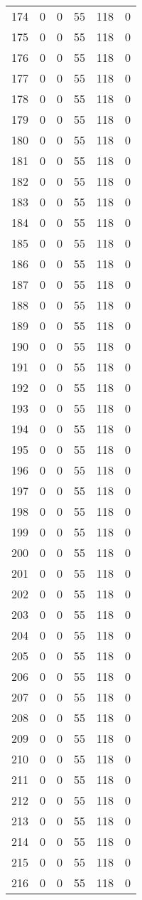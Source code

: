 \documentclass[a4paper]{ctexart}
\begin{document}
\begin{longtable}{p{1cm}|p{2cm}|p{2cm}|p{2cm}|P{2cm}|p{2cm}}
		174&0&0&55&118&0\\
		175&0&0&55&118&0\\
		176&0&0&55&118&0\\
		177&0&0&55&118&0\\
		178&0&0&55&118&0\\
		179&0&0&55&118&0\\
		180&0&0&55&118&0\\
		181&0&0&55&118&0\\
		182&0&0&55&118&0\\
		183&0&0&55&118&0\\
		184&0&0&55&118&0\\
		185&0&0&55&118&0\\
		186&0&0&55&118&0\\
		187&0&0&55&118&0\\
		188&0&0&55&118&0\\
		189&0&0&55&118&0\\
		190&0&0&55&118&0\\
		191&0&0&55&118&0\\
		192&0&0&55&118&0\\
		193&0&0&55&118&0\\
		194&0&0&55&118&0\\
		195&0&0&55&118&0\\
		196&0&0&55&118&0\\
		197&0&0&55&118&0\\
		198&0&0&55&118&0\\
		199&0&0&55&118&0\\
		200&0&0&55&118&0\\
		201&0&0&55&118&0\\
		202&0&0&55&118&0\\
		203&0&0&55&118&0\\
		204&0&0&55&118&0\\
		205&0&0&55&118&0\\
		206&0&0&55&118&0\\
		207&0&0&55&118&0\\
		208&0&0&55&118&0\\
		209&0&0&55&118&0\\
		210&0&0&55&118&0\\
		211&0&0&55&118&0\\
		212&0&0&55&118&0\\
		213&0&0&55&118&0\\
		214&0&0&55&118&0\\
		215&0&0&55&118&0\\
		216&0&0&55&118&0\\

\end{longtable}
\end{document}
